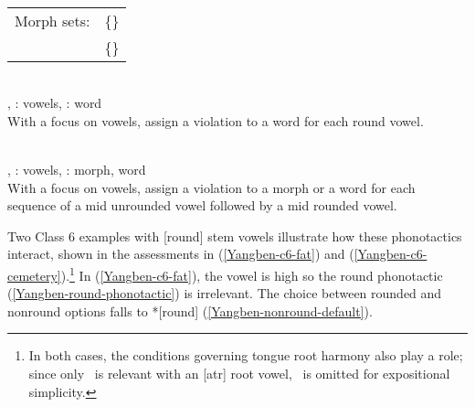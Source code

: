\begin{example}  \label{c3c6-morph-sets}\smallskip\\
\begin{tabularx}{\linewidth}{@{}lQ@{}}
Morph sets: & \{\} \\
            & \{\}
\end{tabularx}
\ex {} \label{Yangben-nonround-default}\smallskip\\
\relax {*[round]}, \tier: vowels, \dom: word\\
With a focus on vowels, assign a violation to a word for each round vowel. 

\ex {}\label{Yangben-round-phonotactic}\smallskip\\
\rd, \tier: vowels, \dom: morph, word\\
With a focus on vowels, assign a violation to a morph or a word for each sequence of a mid unrounded vowel followed by a mid rounded vowel.
\end{example}

Two Class 6 examples with [round] stem vowels illustrate how these phonotactics interact, shown in the assessments in (\ref{Yangben-c6-fat}) and (\ref{Yangben-c6-cemetery}).\footnote{In both cases, the conditions governing tongue root harmony also play a role; since only \latr\ is relevant with an [atr] root vowel, \ratr\ is omitted for expositional simplicity.} In (\ref{Yangben-c6-fat}), the vowel is high so the round phonotactic (\ref{Yangben-round-phonotactic}) is irrelevant. The choice between rounded and nonround options falls to *[round] (\ref{Yangben-nonround-default}).

